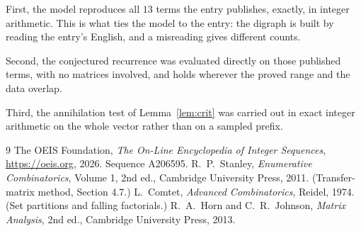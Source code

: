 \documentclass[11pt,a4paper]{article}
\theoremstyle{plain}
\theoremstyle{definition}
\begin{document}
First, the model reproduces all $13$ terms the entry publishes, exactly, in integer
arithmetic. This is what ties the model to the entry: the digraph is built by reading the
entry's English, and a misreading gives different counts.

Second, the conjectured recurrence was evaluated directly on those published terms, with no
matrices involved, and holds wherever the proved range and the data overlap.

Third, the annihilation test of Lemma~\ref{lem:crit} was carried out in exact integer
arithmetic on the whole vector rather than on a sampled prefix.

\begin{thebibliography}{9}
 The OEIS Foundation, \emph{The On-Line Encyclopedia of Integer
Sequences}, \url{https://oeis.org}, 2026. Sequence A206595.
 R.~P.~Stanley, \emph{Enumerative Combinatorics}, Volume 1, 2nd ed.,
Cambridge University Press, 2011. (Transfer-matrix method, Section 4.7.)
 L.~Comtet, \emph{Advanced Combinatorics}, Reidel, 1974. (Set partitions
and falling factorials.)
 R.~A.~Horn and C.~R.~Johnson, \emph{Matrix Analysis}, 2nd ed., Cambridge
University Press, 2013.
\end{thebibliography}
\end{document}

